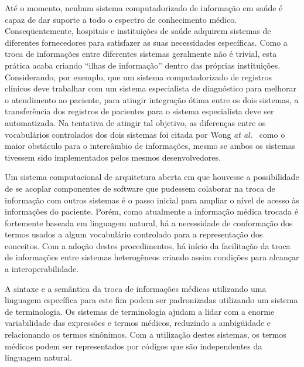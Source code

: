 \documentclass[a4paper, 12pt, ruledheader,pnumplain,normalfigtabnum]{abnt}
\def\etal{{\em at al.}}
\begin{document}
Até o momento, nenhum sistema computadorizado de informação em saúde é
capaz de dar suporte a todo o espectro de conhecimento médico.
Conseqüentemente, hospitais e instituições de saúde adquirem sistemas
de diferentes fornecedores para satisfazer as suas necessidades
específicas. Como a troca de informações entre diferentes sistemas
geralmente não é trivial, esta prática acaba criando ``ilhas de
informação'' dentro das próprias instituições.  Considerando, por
exemplo, que um sistema computadorizado de registros clínicos deve
trabalhar com um sistema especialista de diagnóstico para melhorar o
atendimento ao paciente, para atingir integração ótima entre os dois
sistemas, a transferência dos registros de pacientes para o sistema
especialista deve ser automatizada. Na tentativa de atingir tal
objetivo, as diferenças entre os vocabulários controlados dos dois
sistemas foi citada por Wong \etal~\cite{wong:cbr:1994} como o maior
obstáculo para o intercâmbio de informações, mesmo se ambos os
sistemas tivessem sido implementados pelos mesmos desenvolvedores.

Um sistema computacional de arquitetura aberta em que houvesse a
possibilidade de se acoplar componentes de software que pudessem
colaborar na troca de informação com outros sistemas é o passo inicial
para ampliar o nível de acesso às informações do paciente. Porém, como
atualmente a informação médica trocada é fortemente baseada em
linguagem natural, há a necessidade de conformação dos termos usados a
algum vocabulário controlado para a representação dos conceitos. Com a
adoção destes procedimentos, há início da facilitação da troca de
informações entre sistemas heterogêneos criando assim condições para
alcançar a interoperabilidade.

A sintaxe e a semântica da troca de informações médicas utilizando uma
 linguagem específica para este fim podem ser padronizadas
utilizando um sistema de terminologia.  Os sistemas de terminologia
ajudam a lidar com a enorme variabilidade das expressões e termos
médicos, reduzindo a ambigüidade e relacionando os termos sinônimos.
Com a utilização destes sistemas, os termos médicos podem ser
representados por códigos que são independentes da linguagem natural.


%

\end{document}
